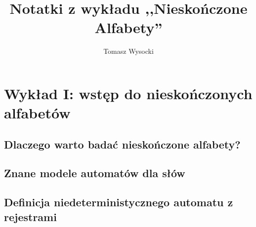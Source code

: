 \documentclass[a4paper,12pt]{report}
\title{Notatki z wykładu ,,Nieskończone Alfabety''}
\author{Tomasz Wysocki}
\begin{document}
\maketitle
\newpage
\tableofcontents
\newpage
\chapter {Wykład I: wstęp do nieskończonych alfabetów}
\section {Dlaczego warto badać nieskończone alfabety?}
\section {Znane modele automatów dla słów}
\section {Definicja niedeterministycznego automatu z rejestrami}
\end{document}
